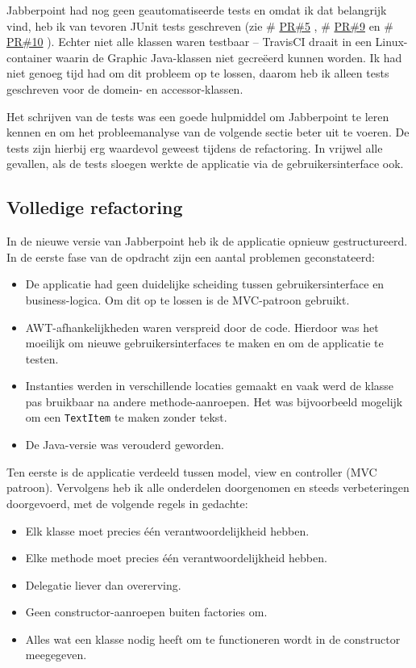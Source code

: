 \documentclass[a4paper]{article}
\makeatletter
\newcommand*{\repo}{\begingroup\@makeother\#\@repo}
\newcommand*{\@repo}[2]{%
  \href{https://github.com/DanielSchiavini/design-patterns-assignment/#1}{#2}%
  \endgroup}
\newcommand{\PR}[1]{\repo{pull/#1}{PR\##1}}
\newcommand{\code}[1]{\lstinline[columns=fixed]{#1}}
\makeatother
\begin{document}
    Jabberpoint had nog geen geautomatiseerde tests en omdat ik dat belangrijk vind, heb ik van tevoren JUnit tests geschreven (zie \PR{5}, \PR{9} en \PR{10}).
    Echter niet alle klassen waren testbaar -- TravisCI draait in een Linux-container waarin de Graphic Java-klassen niet gecreëerd kunnen worden.
    Ik had niet genoeg tijd had om dit probleem op te lossen, daarom heb ik alleen tests geschreven voor de domein- en accessor-klassen.

    Het schrijven van de tests was een goede hulpmiddel om Jabberpoint te leren kennen en om het probleemanalyse van de volgende sectie beter uit te voeren.
	De tests zijn hierbij erg waardevol geweest tijdens de refactoring.
	In vrijwel alle gevallen, als de tests sloegen werkte de applicatie via de gebruikersinterface ook.

	\subsection*{Volledige refactoring}
	In de nieuwe versie van Jabberpoint heb ik de applicatie opnieuw gestructureerd.
	In de eerste fase van de opdracht zijn een aantal problemen geconstateerd:
	\begin{itemize}
		\item De applicatie had geen duidelijke scheiding tussen gebruikersinterface en business-logica.
			Om dit op te lossen is de MVC-patroon gebruikt.
		\item AWT-afhankelijkheden waren verspreid door de code.
			Hierdoor was het moeilijk om nieuwe gebruikersinterfaces te maken en om de applicatie te testen.
		\item Instanties werden in verschillende locaties gemaakt en vaak werd de klasse pas bruikbaar na andere methode-aanroepen.
			Het was bijvoorbeeld mogelijk om een \code{TextItem} te maken zonder tekst.
		\item De Java-versie was verouderd geworden.
	\end{itemize}

	Ten eerste is de applicatie verdeeld tussen model, view en controller (MVC patroon).
	Vervolgens heb ik alle onderdelen doorgenomen en steeds verbeteringen doorgevoerd, met de volgende regels in gedachte:
	\begin{itemize}
		\item Elk klasse moet precies één verantwoordelijkheid hebben.
		\item Elke methode moet precies één verantwoordelijkheid hebben.
		\item Delegatie liever dan overerving.
		\item Geen constructor-aanroepen buiten factories om.
		\item Alles wat een klasse nodig heeft om te functioneren wordt in de constructor meegegeven.
	\end{itemize}
\end{document}
